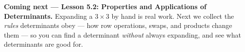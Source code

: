 \documentclass[10pt]{article}
\begin{document}
\begin{spiralbox}
\textbf{Coming next --- Lesson 5.2: Properties and Applications of Determinants.} Expanding a
$3\times3$ by hand is real work. Next we collect the \emph{rules} determinants obey --- how row
operations, swaps, and products change them --- so you can find a determinant \emph{without} always
expanding, and see what determinants are good for.
\end{spiralbox}
\end{document}
